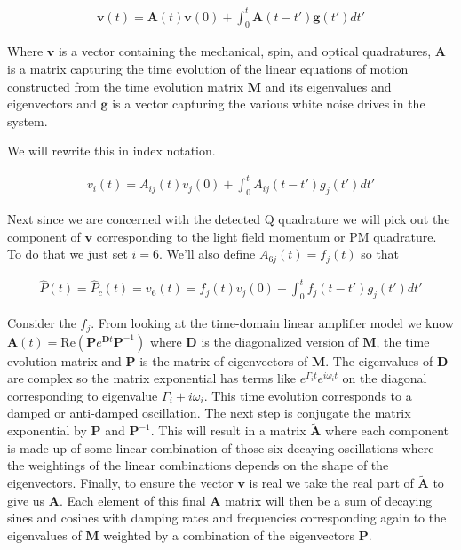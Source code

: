 \documentclass[12pt]{article}
\newcommand{\bv}[1]{\textbf{#1}}
\begin{document}
\begin{align}
\bv{v}(t) = \bv{A}(t)\bv{v}(0) + \int_0^t \bv{A}(t-t')\bv{g}(t')dt'
\end{align}

Where $\bv{v}$ is a vector containing the mechanical, spin, and optical quadratures, $\bv{A}$ is a matrix capturing the time evolution of the linear equations of motion constructed from the time evolution matrix $\bv{M}$ and its eigenvalues and eigenvectors and $\bv{g}$ is a vector capturing the various white noise drives in the system.

We will rewrite this in index notation.

\begin{align}
v_{i}(t) = A_{ij}(t)v_j(0)+\int_0^t A_{ij}(t-t')g_j(t') dt'
\end{align}

Next since we are concerned with the detected Q quadrature we will pick out the component of $\bv{v}$ corresponding to the light field momentum or PM quadrature. To do that we just set $i=6$. We'll also define $A_{6j}(t) = f_j(t)$ so that

\begin{align}
\hat{P}(t) = \hat{P}_c(t) = v_6(t) = f_j(t)v_j(0) + \int_0^t f_j(t-t')g_j(t') dt'
\end{align} 

Consider the $f_j$. From looking at the time-domain linear amplifier model we know $\bv{A}(t) = \text{Re}\left(\bv{P}e^{\bv{D} t}\bv{P}^{-1}\right)$ where $\bv{D}$ is the diagonalized version of $\bv{M}$, the time evolution matrix and $\bv{P}$ is the matrix of eigenvectors of $\bv{M}$. The eigenvalues of $\bv{D}$ are complex so the matrix exponential has terms like $e^{\Gamma_i t}e^{i\omega_i t}$ on the diagonal corresponding to eigenvalue $\Gamma_i + i \omega_i$. This time evolution corresponds to a damped or anti-damped oscillation. The next step is conjugate the matrix exponential by $\bv{P}$ and $\bv{P}^{-1}$. This will result in a matrix $\tilde{\bv{A}}$ where each component is made up of some linear combination of those six decaying oscillations where the weightings of the linear combinations depends on the shape of the eigenvectors. Finally, to ensure the vector $\bv{v}$ is real we take the real part of $\tilde{\bv{A}}$ to give us $\bv{A}$. Each element of this final $\bv{A}$ matrix will then be a sum of decaying sines and cosines with damping rates and frequencies corresponding again to the eigenvalues of $\bv{M}$ weighted by a combination of the eigenvectors $\bv{P}$. 
\end{document}
